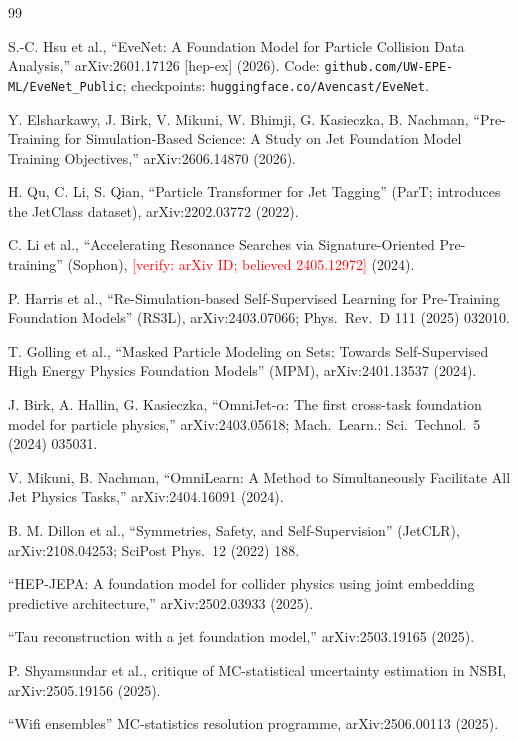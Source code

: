 \documentclass[11pt]{article}
\newcommand{\toverify}[1]{\textcolor{red}{[verify: #1]}}
\begin{document}
\begin{thebibliography}{99}\small

S.-C. Hsu et al.,
``EveNet: A Foundation Model for Particle Collision Data Analysis,''
arXiv:2601.17126 [hep-ex] (2026).
Code: \texttt{github.com/UW-EPE-ML/EveNet\_Public};
checkpoints: \texttt{huggingface.co/Avencast/EveNet}.

Y. Elsharkawy, J. Birk, V. Mikuni, W. Bhimji, G. Kasieczka, B. Nachman,
``Pre-Training for Simulation-Based Science: A Study on Jet Foundation
Model Training Objectives,''
arXiv:2606.14870 (2026).

H. Qu, C. Li, S. Qian,
``Particle Transformer for Jet Tagging'' (ParT; introduces the JetClass
dataset),
arXiv:2202.03772 (2022).

C. Li et al.,
``Accelerating Resonance Searches via Signature-Oriented Pre-training''
(Sophon), \toverify{arXiv ID; believed 2405.12972} (2024).

P. Harris et al.,
``Re-Simulation-based Self-Supervised Learning for Pre-Training Foundation
Models'' (RS3L),
arXiv:2403.07066; Phys.\ Rev.\ D 111 (2025) 032010.

T. Golling et al.,
``Masked Particle Modeling on Sets: Towards Self-Supervised High Energy
Physics Foundation Models'' (MPM),
arXiv:2401.13537 (2024).

J. Birk, A. Hallin, G. Kasieczka,
``OmniJet-$\alpha$: The first cross-task foundation model for particle
physics,''
arXiv:2403.05618; Mach.\ Learn.: Sci.\ Technol.\ 5 (2024) 035031.

V. Mikuni, B. Nachman,
``OmniLearn: A Method to Simultaneously Facilitate All Jet Physics Tasks,''
arXiv:2404.16091 (2024).

B. M. Dillon et al.,
``Symmetries, Safety, and Self-Supervision'' (JetCLR),
arXiv:2108.04253; SciPost Phys.\ 12 (2022) 188.

``HEP-JEPA: A foundation model for collider physics using joint embedding
predictive architecture,''
arXiv:2502.03933 (2025).

``Tau reconstruction with a jet foundation model,''
arXiv:2503.19165 (2025).

P. Shyamsundar et al.,
critique of MC-statistical uncertainty estimation in NSBI,
arXiv:2505.19156 (2025).

``Wifi ensembles'' MC-statistics resolution programme,
arXiv:2506.00113 (2025).

\end{thebibliography}
\end{document}
